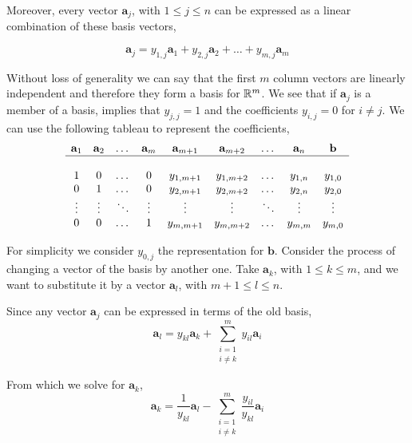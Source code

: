 Moreover, every vector $\mathbf{a}_j$, with $1\leq j \leq n$ can be expressed as a linear combination of these basis vectors,

\begin{equation*}
	\mathbf{a}_j= y_{1,j}\mathbf{a}_1+y_{2,j}\mathbf{a}_2+\dots+y_{m,j}\mathbf{a}_{m}
\end{equation*}




Without loss of generality we can say that the first $m$ column vectors are linearly independent and therefore they form a basis for $\mathbb{R} ^m$. We see that if $\mathbf{a}_j$ is a member of a basis, implies that $y_{j,j}=1$ and the coefficients $y_{i,j}=0$ for $i\neq j$. We can use the following tableau to represent the coefficients,  
\begin{equation}
	\begin{array}{ccccccccc}
	\mathbf{a}_1 & \mathbf{a}_2 &\dots &\mathbf{a}_m & \mathbf{a}_{m+1}& \mathbf{a}_{m+2} &\dots &\mathbf{a}_n & \mathbf{b}\\
	\hline\\
	1 &0&\dots&0 & y_{1,m+1} & y_{1, m+2} &\dots & y_{1, n} & y_{1,0} \\
	0 &1&\dots&0 & y_{2,m+1} & y_{2, m+2} &\dots & y_{2, n} & y_{2,0} \\
	\vdots &\vdots&\ddots &\vdots&\vdots & \vdots & \ddots & \vdots & \vdots \\
	0 & 0 & \dots & 1 & y_{m, m+1}& y_{m,m+2} &\dots & y_{m,m} & y_{m, 0}
	\end{array}\label{eq: Linear Programming tableau}
\end{equation}

For simplicity we consider $y_{0,j}$ the representation for $\mathbf{b}$. Consider the process of changing a vector of the basis by another one. Take $\mathbf{a}_k$, with $1\leq k \leq m$, and we want to substitute it by a vector $\mathbf{a}_l$, with $m+1\leq l \leq n$.

Since any vector $\mathbf{a}_j$ can be expressed in terms of the old basis,
\begin{equation*}
	\mathbf{a}_l = y_{kl}\mathbf{a}_k+\sum_{\begin{array}{c}
		i=1\\i\neq k
		\end{array}}^{m} y_{il}\mathbf{a}_{i}
\end{equation*}

From which we solve for $\mathbf{a}_k$,
\begin{equation*}
	\mathbf{a}_k=\frac{1}{y_{kl}}\mathbf{a}_l-\sum_{\begin{array}{c}i=1\\i\neq k\end{array}}^{m} \frac{y_{il}}{y_{kl}}\mathbf{a}_{i}
\end{equation*}

